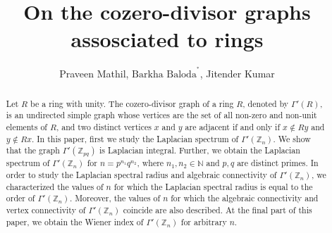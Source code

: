 \documentclass{amsart}
\theoremstyle{plain}
\theoremstyle{definition}
\theoremstyle{remark}
\begin{document}
	\title[On the cozero-divisor graphs assosciated to rings ]{On the cozero-divisor graphs assosciated to rings}
\author[Praveen Mathil, Barkha Baloda Jitender Kumar]{Praveen Mathil, $\text{Barkha Baloda}^{^*}$, Jitender Kumar}
	\address{Department of Mathematics, Birla Institute of Technology and Science Pilani, Pilani, India}
	
	
	
\begin{abstract}
Let $R$ be a ring with unity. The cozero-divisor graph of a ring $R$, denoted by
$\Gamma'(R)$, is an undirected simple graph whose vertices are the set of all
non-zero and non-unit elements of $R$, and two distinct vertices $x$ and $y$  are
adjacent if and only if $x \notin Ry$ and $y \notin Rx$. In this paper, first we study the Laplacian spectrum of $\Gamma'(\mathbb{Z}_n)$. We show that the graph $\Gamma'(\mathbb{Z}_{pq})$ is Laplacian integral. Further, we obtain the Laplacian spectrum of  $\Gamma'(\mathbb{Z}_n)$ for $n = p^{n_1}q^{n_2}$, where $n_1, n_2 \in \mathbb{N}$ and $p, q$ are distinct primes. In order to study the Laplacian spectral radius and algebraic connectivity of $\Gamma'(\mathbb{Z}_n)$, we characterized the values of $n$ for which the Laplacian spectral radius is equal to the order of $\Gamma'(\mathbb{Z}_n)$. Moreover, the values of $n$ for which the algebraic connectivity and vertex connectivity of $\Gamma'(\mathbb{Z}_n)$ coincide are also described. At the final part of this paper, we obtain the Wiener index of $\Gamma'(\mathbb{Z}_n)$ for arbitrary $n$.
\end{abstract}
\maketitle
\end{document}
